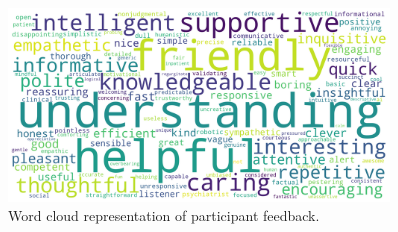 \begin{figure}[!htbp]
	\centering
	\includegraphics[width=0.9\textwidth]{fig/wordcloud.png}
	\caption[Word cloud representation of participant feedback]{Word cloud representation of participant feedback.}
	\label{word_cloud}
\end{figure}
